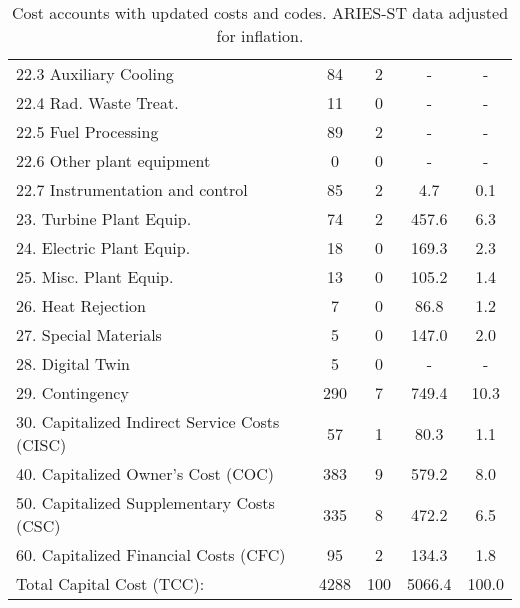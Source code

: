 \begin{table}[h!]
{\begin{tabular}{lcccc}
\hspace{10mm}22.3 Auxiliary Cooling & 84 & 2 & - & - \\
\hspace{10mm}22.4 Rad. Waste Treat. & 11 & 0 & - & - \\
\hspace{10mm}22.5 Fuel Processing & 89 & 2 & - & - \\
\hspace{10mm}22.6 Other plant equipment & 0 & 0 & - & - \\
\hspace{10mm}22.7 Instrumentation and control & 85 & 2 & 4.7 & 0.1 \\
\hspace{5mm}23. Turbine Plant Equip. & 74 & 2 & 457.6 & 6.3 \\
\hspace{5mm}24. Electric Plant Equip. & 18 & 0 & 169.3 & 2.3 \\
\hspace{5mm}25. Misc. Plant Equip. & 13 & 0 & 105.2 & 1.4 \\
\hspace{5mm}26. Heat Rejection & 7 & 0 & 86.8 & 1.2 \\
\hspace{5mm}27. Special Materials & 5 & 0 & 147.0 & 2.0 \\
\hspace{5mm}28. Digital Twin & 5 & 0 & - & - \\
\hspace{5mm}29. Contingency & 290 & 7 & 749.4 & 10.3 \\
30. Capitalized Indirect Service Costs (CISC) & 57 & 1 & 80.3 & 1.1 \\
40. Capitalized Owner’s Cost (COC) & 383 & 9 & 579.2 & 8.0 \\
50. Capitalized Supplementary Costs (CSC) & 335 & 8 & 472.2 & 6.5 \\
60. Capitalized Financial Costs (CFC) & 95 & 2 & 134.3 & 1.8 \\
\hline
Total Capital Cost (TCC): & 4288 & 100 & 5066.4 & 100.0 \\
\hline
\end{tabular}
}
\caption{Cost accounts with updated costs and codes. ARIES-ST data adjusted for inflation.}
\label{tab:costs_updated_codes}
\end{table}


